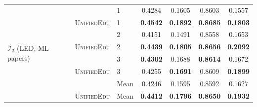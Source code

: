 \documentclass[11pt]{article}
\theoremstyle{plain}
\theoremstyle{definition}
\theoremstyle{remark}
\newcommand{\UniEdu}{\textsc{UnifiedEdu}}
\newcommand{\indiv}{\text{indiv}}
\begin{document}
\begin{table}[t]
\begin{tabular}{ll l cccc}
\midrule
\multirow{8}{*}{$\mathcal{I}_2$ (LED, ML papers)}
  & \indiv    & 1     & 0.4284 & 0.1605 & 0.8603 & 0.1557 \\
  & \UniEdu{} & 1     & \textbf{0.4542} & \textbf{0.1892} & \textbf{0.8685} & \textbf{0.1803} \\
  & \indiv    & 2     & 0.4151 & 0.1491 & 0.8558 & 0.1653 \\
  & \UniEdu{} & 2     & \textbf{0.4439} & \textbf{0.1805} & \textbf{0.8656} & \textbf{0.2092} \\
  & \indiv    & 3     & \textbf{0.4302} & 0.1688 & \textbf{0.8614} & 0.1672 \\
  & \UniEdu{} & 3     & 0.4255 & \textbf{0.1691} & 0.8609 & \textbf{0.1899} \\
  & \indiv    & Mean  & 0.4246 & 0.1595 & 0.8592 & 0.1627 \\
  & \UniEdu{} & Mean  & \textbf{0.4412} & \textbf{0.1796} & \textbf{0.8650} & \textbf{0.1932} \\
\bottomrule
\end{tabular}
\end{table}
\end{document}
